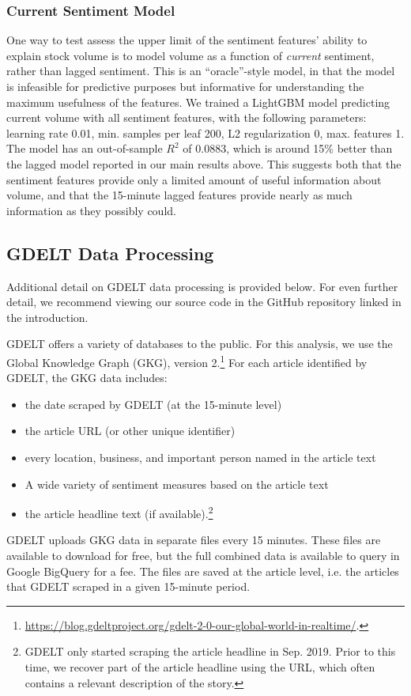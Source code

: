 \documentclass[12pt]{article}
\begin{document}
\subsubsection{Current Sentiment Model}
One way to test assess the upper limit of the sentiment features' ability to explain stock volume is to model volume as a function of \textit{current} sentiment, rather than lagged sentiment. This is an ``oracle''-style model, in that the model is infeasible for predictive purposes but informative for understanding the maximum usefulness of the features. We trained a LightGBM model predicting current volume with all sentiment features, with the following parameters: learning rate 0.01, min. samples per leaf 200, L2 regularization 0, max. features 1. The model has an out-of-sample $R^2$ of 0.0883, which is around 15\% better than the lagged model reported in our main results above. This suggests both that the sentiment features provide only a limited amount of useful information about volume, and that the 15-minute lagged features provide nearly as much information as they possibly could.

\subsection{GDELT Data Processing}
\label{section:gdelt_details}
Additional detail on GDELT data processing is provided below. For even further detail, we recommend viewing our source code in the GitHub repository linked in the introduction.

GDELT offers a variety of databases to the public. For this analysis, we use the Global Knowledge Graph (GKG), version 2.\footnote{\url{https://blog.gdeltproject.org/gdelt-2-0-our-global-world-in-realtime/}.} For each article identified by GDELT, the GKG data includes:
\begin{itemize}
\singlespacing
    \item the date scraped by GDELT (at the 15-minute level)
    \item the article URL (or other unique identifier)
    \item every location, business, and important person named in the article text
    \item A wide variety of sentiment measures based on the article text
    \item the article headline text (if available).\footnote{GDELT only started scraping the article headline in Sep. 2019. Prior to this time, we recover part of the article headline using the URL, which often contains a relevant description of the story.}
\end{itemize}
GDELT uploads GKG data in separate files every 15 minutes. These files are available to download for free, but the full combined data is available to query in Google BigQuery for a fee. The files are saved at the article level, i.e. the articles that GDELT scraped in a given 15-minute period.
\end{document}
